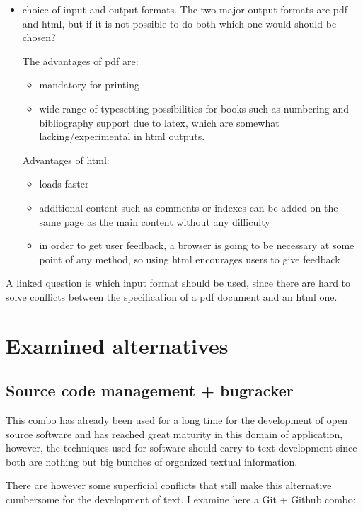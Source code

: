 \documentclass[12pt]{article}
\begin{document}
\begin{itemize}
  \item choice of input and output formats. The two major output formats are pdf and html, but if it is not possible to do both which one would should be chosen?
  
  The advantages of pdf are:
  
  \begin{itemize}
    \item mandatory for printing
    \item wide range of typesetting possibilities for books such as numbering and bibliography support due to latex, which are somewhat lacking/experimental in html outputs.
  \end{itemize}
  
  Advantages of html:
  
  \begin{itemize}
    \item loads faster
    \item additional content such as comments or indexes can be added on the same page as the main content without any difficulty
    \item in order to get user feedback, a browser is going to be necessary at some point of any method, so using html encourages users to give feedback
  \end{itemize}
  
\end{itemize}

A linked question is which input format should be used, since there are hard to solve conflicts between the specification of a pdf document and an html one.

\section{Examined alternatives}

\subsection{Source code management + bugracker}

This combo has already been used for a long time for the development of open source software and has reached great maturity in this domain of application, however, the techniques used for software should carry to text development since both are nothing but big bunches of organized textual information.

There are however some superficial conflicts that still make this alternative cumbersome for the development of text. I examine here a Git + Github combo:
\end{document}

